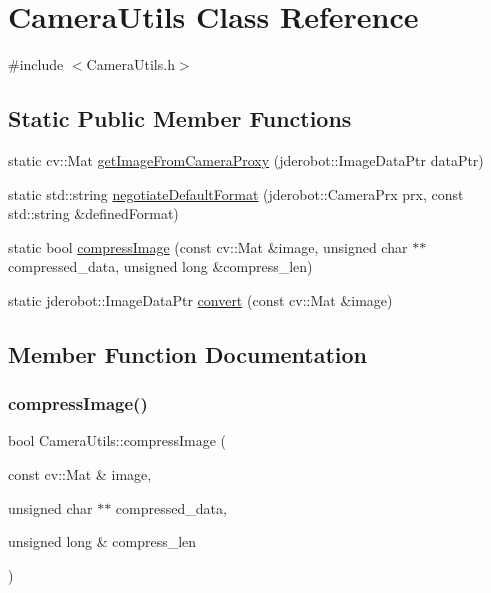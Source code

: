 \hypertarget{class_camera_utils}{}\section{Camera\+Utils Class Reference}
\label{class_camera_utils}


{\ttfamily \#include $<$Camera\+Utils.\+h$>$}

\subsection*{Static Public Member Functions}
\begin{DoxyCompactItemize}
\item 
static cv\+::\+Mat \hyperlink{class_camera_utils_a926f945480f84f9a2078cfd651b15c33}{get\+Image\+From\+Camera\+Proxy} (jderobot\+::\+Image\+Data\+Ptr data\+Ptr)
\item 
static std\+::string \hyperlink{class_camera_utils_a4eb121d34116f081d07a7cbf6994b43e}{negotiate\+Default\+Format} (jderobot\+::\+Camera\+Prx prx, const std\+::string \&defined\+Format)
\item 
static bool \hyperlink{class_camera_utils_a432aaed36b79f14f122991b883f6382c}{compress\+Image} (const cv\+::\+Mat \&image, unsigned char $\ast$$\ast$compressed\+\_\+data, unsigned long \&compress\+\_\+len)
\item 
static jderobot\+::\+Image\+Data\+Ptr \hyperlink{class_camera_utils_a38071971e6fec4d3786223ebd972e778}{convert} (const cv\+::\+Mat \&image)
\end{DoxyCompactItemize}


\subsection{Member Function Documentation}
\mbox{\label{class_camera_utils_a432aaed36b79f14f122991b883f6382c}} 
\subsubsection{\texorpdfstring{compress\+Image()}{compressImage()}}
{\footnotesize\ttfamily bool Camera\+Utils\+::compress\+Image (\begin{DoxyParamCaption}\item[{const cv\+::\+Mat \&}]{image,  }\item[{unsigned char $\ast$$\ast$}]{compressed\+\_\+data,  }\item[{unsigned long \&}]{compress\+\_\+len }\end{DoxyParamCaption})\hspace{0.3cm}{\ttfamily [static]}}

